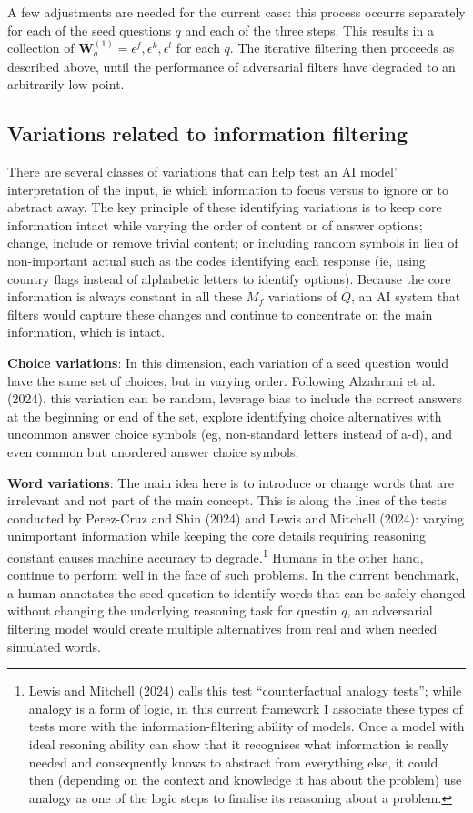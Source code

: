 \documentclass[
]{article}
\begin{document}
A few adjustments are needed for the current case: this process occurrs
separately for each of the seed questions \(q\) and each of the three
steps. This results in a collection of
\(\mathbf{W}_q^{(1)} = \epsilon^f, \epsilon^k, \epsilon^l\) for each
\(q\). The iterative filtering then proceeds as described above, until
the performance of adversarial filters have degraded to an arbitrarily
low point.

\subsection{Variations related to information
filtering}\label{variations-related-to-information-filtering}

There are several classes of variations that can help test an AI model'
interpretation of the input, ie which information to focus versus to
ignore or to abstract away. The key principle of these identifying
variations is to keep core information intact while varying the order of
content or of answer options; change, include or remove trivial content;
or including random symbols in lieu of non-important actual such as the
codes identifying each response (ie, using country flags instead of
alphabetic letters to identify options). Because the core information is
always constant in all these \(M_f\) variations of \(Q\), an AI system
that filters would capture these changes and continue to concentrate on
the main information, which is intact.

\textbf{Choice variations}: In this dimension, each variation of a seed
question would have the same set of choices, but in varying order.
Following Alzahrani et al. (2024), this variation can be random,
leverage bias to include the correct answers at the beginning or end of
the set, explore identifying choice alternatives with uncommon answer
choice symbols (eg, non-standard letters instead of a-d), and even
common but unordered answer choice symbols.

\textbf{Word variations}: The main idea here is to introduce or change
words that are irrelevant and not part of the main concept. This is
along the lines of the tests conducted by Perez-Cruz and Shin (2024) and
Lewis and Mitchell (2024): varying unimportant information while keeping
the core details requiring reasoning constant causes machine accuracy to
degrade.\footnote{Lewis and Mitchell (2024) calls this test
  ``counterfactual analogy tests''; while analogy is a form of logic, in
  this current framework I associate these types of tests more with the
  information-filtering ability of models. Once a model with ideal
  resoning ability can show that it recognises what information is
  really needed and consequently knows to abstract from everything else,
  it could then (depending on the context and knowledge it has about the
  problem) use analogy as one of the logic steps to finalise its
  reasoning about a problem.} Humans in the other hand, continue to
perform well in the face of such problems. In the current benchmark, a
human annotates the seed question to identify words that can be safely
changed without changing the underlying reasoning task for questin
\(q\), an adversarial filtering model would create multiple alternatives
from real and when needed simulated words.
\end{document}
